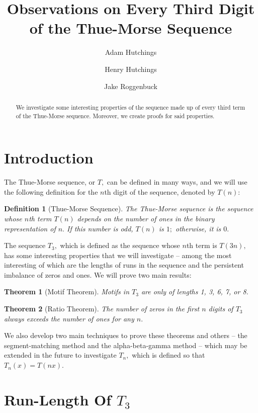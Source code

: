 \documentclass{article}
\newtheorem{theorem}{Theorem}[section]
\newtheorem{definition}{Definition}[section]
\begin{document}
\title{Observations on Every Third Digit of the Thue-Morse Sequence}
\author{
	Adam Hutchings
	\and
	Henry Hutchings
	\and
	Jake Roggenbuck
}
\maketitle

\begin{abstract}
We investigate some interesting properties of the sequence made up of every third term of the Thue-Morse sequence. Moreover, we create proofs for said properties.
\end{abstract}

\tableofcontents

\section{Introduction}
The Thue-Morse sequence, or $T,$ can be defined in many ways, and we will use the following definition for the $n$th digit of the sequence, denoted by $T(n):$ 
\begin{definition}[Thue-Morse Sequence]
The Thue-Morse sequence is the sequence whose $n$th term $T(n)$ depends on the number of ones in the binary representation of $n.$ If this number is odd, $T(n)$ is $1;$ otherwise, it is $0.$
\end{definition}
The sequence $T_3,$ which is defined as the sequence whose $n$th term is $T(3n),$ has some interesting properties that we will investigate -- among the most interesting of which are the lengths of runs in the sequence and the persistent imbalance of zeros and ones. We will prove two main results:

\begin{theorem}[Motif Theorem]
\label{mlength}
Motifs in $T_3$ are only of lengths 1, 3, 6, 7, or 8.
\end{theorem}

\begin{theorem}[Ratio Theorem]
\label{ratio}
The number of zeros in the first $n$ digits of $T_3$ always exceeds the number of ones for any $n.$
\end{theorem}

We also develop two main techniques to prove these theorems and others -- the segment-matching method and the alpha-beta-gamma method -- which may be extended in the future to investigate $T_n,$ which is defined so that $T_n(x) = T(nx).$

\section{Run-Length Of $T_3$}
\end{document}
